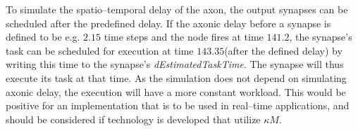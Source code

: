 		To simulate the spatio--temporal delay of the axon, the output synapses can be scheduled after the predefined delay.
		If the axonic delay before a synapse is defined to be e.g. $2.15$ time steps and the node fires at time $141.2$, the synapse's task can be scheduled for execution at time $143.35$(after the defined delay) by writing this time to the synapse's \emph{dEstimatedTaskTime}.
		The synapse will thus execute its task at that time.
		As the simulation does not depend on simulating axonic delay, the execution will have a more constant workload.
		This would be positive for an implementation that is to be used in real--time applications, and should be considered if technology is developed that utilize $\kappa M$.
		
		


	




